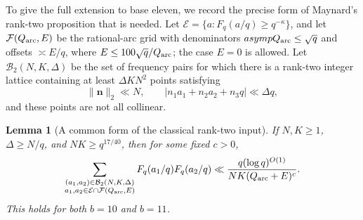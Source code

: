 \documentclass[11pt,a4paper]{article}
\theoremstyle{paperplain}
\newtheorem{lemma}[theorem]{Lemma}
\numberwithin{equation}{section}
\begin{document}
To give the full extension to base eleven, we record the precise form
of Maynard's rank-two proposition that is needed.
Let $\mathcal E=\{a:F_q(a/q)\ge q^{-\kappa}\}$, and let
$\mathcal F(Q_{
 \rm arc},E)$ be the rational-arc grid with denominators
$\asymp Q_{\rm arc}\le\sqrt q$ and offsets $\asymp E/q$,
where $E\le100\sqrt q/Q_{\rm arc}$; the case $E=0$ is allowed.
Let $\mathcal B_2(N,K,\Delta)$ be the set of frequency pairs for which
there is a rank-two integer lattice containing at least $\Delta KN^2$
points satisfying
\[
 \|\mathbf n\|_2\ll N,\qquad
 |n_1a_1+n_2a_2+n_3q|\ll\Delta q,
\]
and these points are not all collinear.

\begin{lemma}[A common form of the classical rank-two input]\label{dec:classicalrank}
If $N,K\ge1$, $\Delta\ge N/q$, and $NK\ge q^{17/40}$,
then for some fixed $c>0$,
\begin{equation}\label{dec:classicalrankbound}
 \sum_{\substack{(a_1,a_2)\in\mathcal B_2(N,K,\Delta)\\
 a_1,a_2\in\mathcal E\cap\mathcal F(Q_{\rm arc},E)}}
 F_q(a_1/q)F_q(a_2/q)
 \ll\frac{q(\log q)^{O(1)}}{NK(Q_{\rm arc}+E)^c}.
\end{equation}
This holds for both $b=10$ and $b=11$.
\end{lemma}
\end{document}
